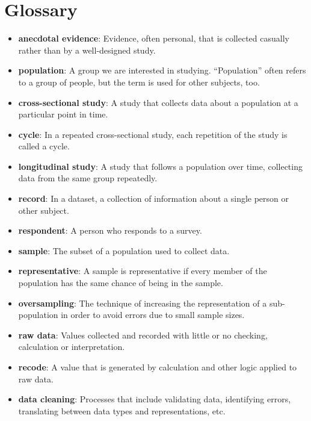 \documentclass[12pt]{book}
\begin{document}
\section{Glossary}

\begin{itemize}

\item {\bf anecdotal evidence}: Evidence, often personal, that is collected
  casually rather than by a well-designed study.

\item {\bf population}: A group we are interested in studying.
  ``Population'' often refers to a
  group of people, but the term is used for other subjects,
  too.

\item {\bf cross-sectional study}: A study that collects data about a
population at a particular point in time.

\item {\bf cycle}: In a repeated cross-sectional study, each repetition
of the study is called a cycle.

\item {\bf longitudinal study}: A study that follows a population over
time, collecting data from the same group repeatedly.

\item {\bf record}: In a dataset, a collection of information about
a single person or other subject.

\item {\bf respondent}: A person who responds to a survey.

\item {\bf sample}: The subset of a population used to collect data.

\item {\bf representative}: A sample is representative if every member
of the population has the same chance of being in the sample.

\item {\bf oversampling}: The technique of increasing the representation
of a sub-population in order to avoid errors due to small sample
sizes.

\item {\bf raw data}: Values collected and recorded with little or no
checking, calculation or interpretation.

\item {\bf recode}: A value that is generated by calculation and other
logic applied to raw data.

\item {\bf data cleaning}: Processes that include validating data,
  identifying errors, translating between data types and
  representations, etc.

\end{itemize}
\end{document}
